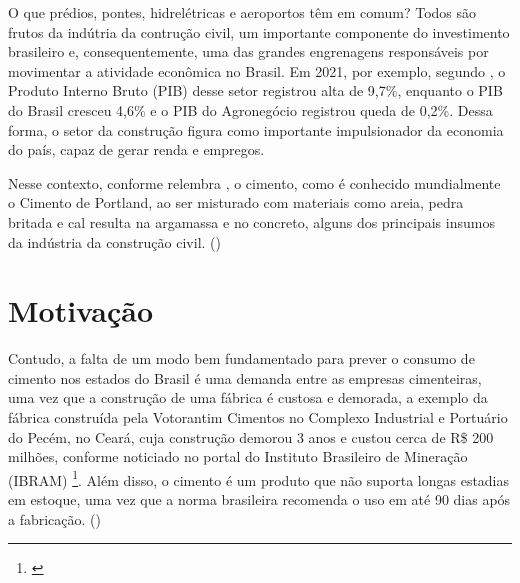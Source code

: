 


\label{cap:introducao}

\enlargethispage{.5\baselineskip}

O que prédios, pontes, hidrelétricas e aeroportos têm em 
comum? Todos são frutos da indútria da contrução civil, 
um importante componente do investimento brasileiro e, 
consequentemente, uma das grandes engrenagens responsáveis 
por movimentar a atividade econômica no Brasil. Em 2021, 
por exemplo, segundo \cite{cbic-report}, o Produto Interno Bruto (PIB) desse setor 
registrou alta de 9,7\%, enquanto o PIB do Brasil cresceu 
4,6\% e o PIB do Agronegócio registrou queda de 0,2\%. Dessa 
forma, o setor da construção figura como importante 
impulsionador da economia do país, capaz de gerar renda e 
empregos. 

Nesse contexto, conforme relembra \cite{quali}, o cimento, 
como é conhecido mundialmente o Cimento de Portland,
 ao ser misturado com materiais como areia, pedra 
britada e cal resulta na argamassa e no 
concreto, alguns dos principais insumos da indústria da 
construção civil. (\cite{boletim-cimento})

\section*{Motivação}

Contudo, a falta de um modo bem fundamentado para prever o 
consumo de cimento nos estados do Brasil é 
uma demanda entre as empresas cimenteiras, uma vez que a 
construção de uma fábrica é custosa e demorada, a exemplo 
da fábrica construída pela Votorantim Cimentos no Complexo 
Industrial e Portuário do Pecém, no Ceará, cuja construção 
demorou 3 anos e custou cerca de R\$ 200 milhões, conforme 
noticiado no portal do Instituto Brasileiro de Mineração (IBRAM)
\footnote{\cite{fabrica-noticia}}.
Além disso, o cimento é um produto que não suporta longas 
estadias em estoque, uma vez que a norma brasileira recomenda
o uso em até 90 dias após a fabricação. (\cite{abnt})

